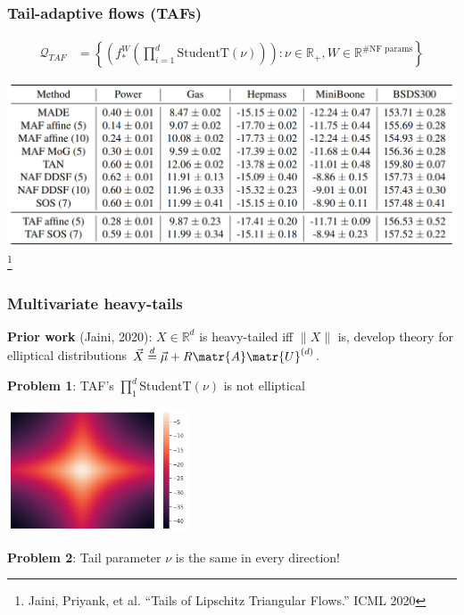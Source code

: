 \documentclass{beamer}
\newcommand{\RR}{\mathbb{R}}
\newcommand{\cQ}{\mathcal{Q}}
\begin{document}
\begin{frame}
    \frametitle{Tail-adaptive flows (TAFs)}
    \begin{definition}
        \begin{align*}
            \cQ_{TAF} & = \left\{
            \left(f^W_\ast \left(\prod_{i=1}^d \text{StudentT}(\nu)\right)\right):
            \nu \in \RR_+, W \in \RR^{\text{\# NF params}}
            \right\}
        \end{align*}
    \end{definition}

    \begin{center}
        \includegraphics[width=1.0\textwidth]{Figures/taf-table.png}
        \footnote{Jaini, Priyank, et al. ``Tails of Lipschitz Triangular Flows.'' ICML 2020}
    \end{center}
\end{frame}

\begin{frame}
    \frametitle{Multivariate heavy-tails}

    \textbf{Prior work} (Jaini, 2020): $X \in \RR^d$ is heavy-tailed iff $\|X\|$ is,
    develop theory for elliptical distributions
    $\vec{X} \overset{d}{=} \vec{\mu} + R \matr{A} \matr{U}^{(d)}$.

    \textbf{Problem 1}: TAF's $\prod_1^d \text{StudentT}(\nu)$ is not elliptical
    \begin{center}
        \includegraphics[width=0.4\textwidth]{../Figures/studentt-product.png}
    \end{center}

    \textbf{Problem 2}: Tail parameter $\nu$ is the same in every direction!
\end{frame}
\end{document}
